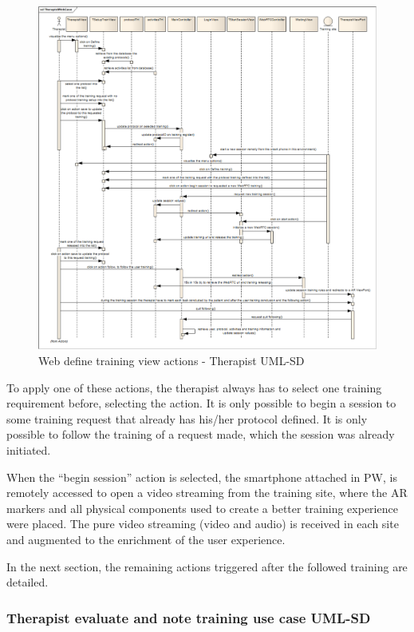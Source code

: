 \begin{figure}[!hbt]
\begin{center}
\includegraphics[width=1 \textwidth]{img/cap4/UMLSD-TherapistWebCase04}
\caption{Web define training view actions - Therapist UML-SD}
\label{fig:UMLSD-TherapistWebCase04}
\end{center}
\end{figure} 

To apply one of these actions, the therapist always has to select one training requirement before, selecting the action. It is only possible to begin a session to some training request that already has his/her protocol defined. It is only possible to follow the training of a request made, which the session was already initiated. 

When the ``begin session'' action is selected, the smartphone attached in PW, is remotely accessed to open a video streaming from the training site, where the AR markers and all physical components used to create a better training experience were placed. The pure video streaming (video and audio) is received in each site and augmented to the enrichment of the user experience. 

In the next section, the remaining actions triggered after the followed training are detailed.

\subsubsection{Therapist evaluate and note training use case UML-SD}

